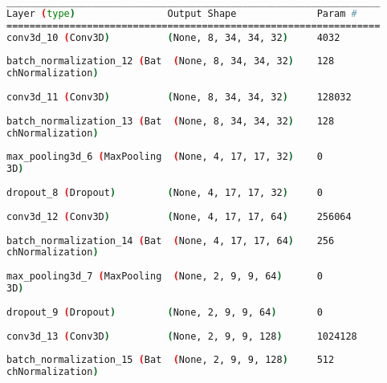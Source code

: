 \begin{lstlisting}[language=Bash,caption={Overview of layers in 3D convolutional network},label={lst:3d_conv_layers},numbers=none,float=htb]
_________________________________________________________________
Layer (type)                Output Shape              Param #   
=================================================================
conv3d_10 (Conv3D)          (None, 8, 34, 34, 32)     4032      
                                                                
batch_normalization_12 (Bat  (None, 8, 34, 34, 32)    128       
chNormalization)                                                
                                                                
conv3d_11 (Conv3D)          (None, 8, 34, 34, 32)     128032    
                                                                
batch_normalization_13 (Bat  (None, 8, 34, 34, 32)    128       
chNormalization)                                                
                                                                
max_pooling3d_6 (MaxPooling  (None, 4, 17, 17, 32)    0         
3D)                                                             
                                                                
dropout_8 (Dropout)         (None, 4, 17, 17, 32)     0         
                                                                
conv3d_12 (Conv3D)          (None, 4, 17, 17, 64)     256064    
                                                                
batch_normalization_14 (Bat  (None, 4, 17, 17, 64)    256       
chNormalization)                                                
                                                                
max_pooling3d_7 (MaxPooling  (None, 2, 9, 9, 64)      0         
3D)                                                             
                                                                
dropout_9 (Dropout)         (None, 2, 9, 9, 64)       0         
                                                                
conv3d_13 (Conv3D)          (None, 2, 9, 9, 128)      1024128   
                                                                
batch_normalization_15 (Bat  (None, 2, 9, 9, 128)     512       
chNormalization)                                                
                                                                

\end{lstlisting}

